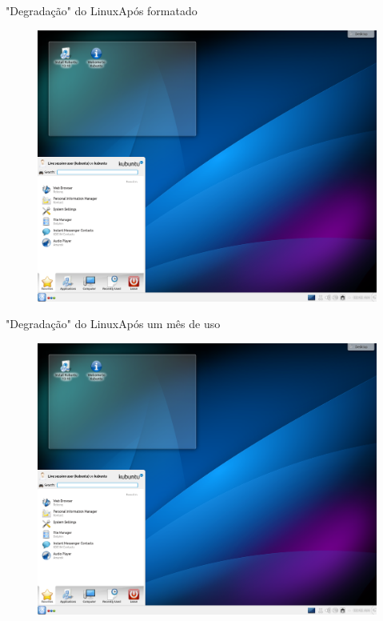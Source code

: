 \documentclass{beamer}
\begin{document}
\begin{frame}{"Degradação" do Linux}{Após formatado}
    \begin{figure}[h!]
        \centering
        \includegraphics[scale=0.25]{Kubuntu.png}
    \end{figure}
\end{frame}


\begin{frame}{"Degradação" do Linux}{Após um mês de uso}
    \begin{figure}[h!]
        \centering
        \includegraphics[scale=0.25]{Kubuntu.png}
    \end{figure}
\end{frame}
\end{document}
